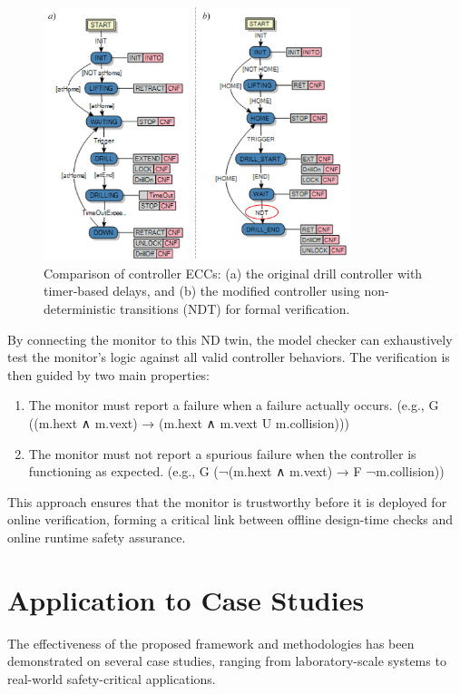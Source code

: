 \begin{figure}[h]
\centering
\includegraphics[width=0.8\textwidth]{chapters/images/chapter2/Fig10.png}
\caption{Comparison of controller ECCs: (a) the original drill controller with timer-based delays, and (b) the modified controller using non-deterministic transitions (NDT) for formal verification.}
\label{fig:controller_ndts}
\end{figure}

By connecting the monitor to this ND twin, the model checker can exhaustively test the monitor's logic against all valid controller behaviors. The verification is then guided by two main properties:

\begin{enumerate}
\item The monitor must report a failure when a failure actually occurs. (e.g., G ((m.hext ∧ m.vext) → (m.hext ∧ m.vext U m.collision)))
\item The monitor must not report a spurious failure when the controller is functioning as expected. (e.g., G (¬(m.hext ∧ m.vext) → F ¬m.collision))
\end{enumerate}

This approach ensures that the monitor is trustworthy before it is deployed for online verification, forming a critical link between offline design-time checks and online runtime safety assurance.

\section{Application to Case Studies}\label{sec:case_studies}

The effectiveness of the proposed framework and methodologies has been demonstrated on several case studies, ranging from laboratory-scale systems to real-world safety-critical applications.

